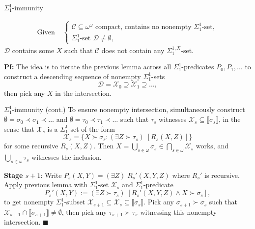\begin{frame}{$\Sigma_1^{1}$-immunity}
  \begin{thm*}
    \begin{align*}
      \text{Given } &\begin{cases}
        \mathcal{C}\subseteq\omega^\omega \text{ compact, contains
        no nonempty } \Sigma_1^{1}\text{-set},\\
        \Sigma_1^{1}\text{-set } \mathcal{D}\neq\emptyset,
      \end{cases}
    \end{align*}
    $\mathcal{D}$ contains some $X$ such that $\mathcal{C}$ does not
    contain any $\Sigma_1^{1,X}$-set.
  \end{thm*}

  \pause
  \vspace{1em}
  \textbf{Pf:} The idea is to iterate the previous lemma across all
  $\Sigma^1_1$-predicates $P_0,P_1,\ldots$ to construct a descending
  sequence of nonempty $\Sigma^1_1$-sets
  \[\mathcal{D} =\mathcal{X}_0 \supseteq\mathcal{X}_1 \supseteq\ldots,\]
  then pick any $X$ in the intersection.
\end{frame}

\begin{frame}{$\Sigma_1^{1}$-immunity (cont.)}
  To ensure nonempty intersection, simultaneously construct
  $\emptyset= \sigma_0\prec\sigma_1\prec\ldots$ and $\emptyset=
  \tau_0\prec\tau_1\prec\ldots$ such that $\tau_s$ witnesses $\mathcal{X}_s
  \subseteq \llbracket\sigma_s\rrbracket$, in the sense that
  $\mathcal{X}_s$ is a $\Sigma^1_1$-set of the form
  \[\mathcal{X}_s =\{X\succ\sigma_s: (\exists Z\succ\tau_s)\;
  [R_s(X,Z)]\}\]
  for some recursive $R_s(X,Z)$. Then $X=\bigcup_{s\in\omega} \sigma_s \in
  \bigcap_{s\in\omega} \mathcal{X}_s$ works, and
  $\bigcup_{s\in\omega} \tau_s$ witnesses the inclusion.

  \pause
  \vspace{1.5em}
  \textbf{Stage $s+1$}: Write $P_s(X,Y) =(\exists Z)\; R_s'(X,Y,Z)$ where
  $R_s'$ is recursive. Apply previous lemma with $\Sigma^1_1$-set
  $\mathcal{X}_s$ and $\Sigma^1_1$-predicate 
  \[P_s'(X,Y) :=(\exists Z\succ\tau_s)\; [R_s'(X,Y,Z) \wedge
  X\succ\sigma_s],\]
  to get nonempty $\Sigma^1_1$-subset $\mathcal{X}_{s+1} \subseteq
  \mathcal{X}_s \subseteq \llbracket\sigma_s\rrbracket$. Pick any
  $\sigma_{s+1}\succ\sigma_s$ such that $\mathcal{X}_{s+1}\cap
  \llbracket\sigma_{s+1}\rrbracket \neq\emptyset$, then pick any
  $\tau_{s+1}\succ\tau_s$ witnessing this nonempty intersection.
  $\blacksquare$
\end{frame}

